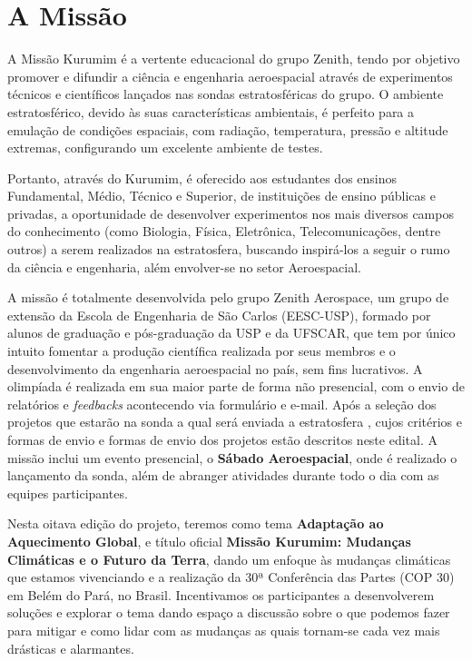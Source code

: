 \section{A Missão}\label{sec:missao}
    \par A Missão Kurumim é a vertente educacional do grupo Zenith, tendo por objetivo promover e difundir a ciência e engenharia aeroespacial através de experimentos técnicos e científicos lançados nas sondas estratosféricas do grupo. O ambiente estratosférico, devido às suas características ambientais, é perfeito para a emulação de condições espaciais, com radiação, temperatura, pressão e altitude extremas, configurando um excelente ambiente de testes.
    
    \par Portanto, através do Kurumim, é oferecido aos estudantes dos ensinos Fundamental, Médio, Técnico e Superior, de instituições de ensino públicas e privadas, a oportunidade de desenvolver experimentos nos mais diversos campos do conhecimento (como Biologia, Física, Eletrônica, Telecomunicações, dentre outros) a serem realizados na estratosfera, buscando inspirá-los a seguir o rumo da ciência e engenharia, além envolver-se no setor Aeroespacial.
    
    \par A missão é totalmente desenvolvida pelo grupo Zenith Aerospace, um grupo de extensão da 
    Escola de Engenharia de São Carlos (EESC-USP), formado por alunos de graduação e pós-graduação da USP
    e da UFSCAR, que tem por único intuito fomentar a produção científica realizada por seus membros e o 
    desenvolvimento da engenharia aeroespacial no país, sem fins lucrativos. 
    A olimpíada é realizada em sua maior parte de forma não presencial, com o envio de relatórios e \emph{feedbacks}
    acontecendo via formulário e e-mail. Após a seleção dos projetos que estarão na sonda a qual será enviada a estratosfera
    , cujos critérios e formas de envio e formas de envio dos projetos estão descritos neste edital. A missão
    inclui um evento presencial, o \textbf{Sábado Aeroespacial}, onde é realizado o lançamento da sonda, além
    de abranger atividades durante todo o dia com as equipes participantes.
    
    \par Nesta oitava edição do projeto, teremos como tema \textbf{Adaptação ao Aquecimento Global}, 
    e título oficial \textbf{Missão Kurumim: Mudanças Climáticas e o Futuro da Terra}, dando um enfoque
    às mudanças climáticas que estamos vivenciando e a realização da 30ª Conferência das Partes (COP 30) em Belém do Pará, no Brasil.
    Incentivamos os participantes a desenvolverem soluções e explorar o tema dando espaço a discussão sobre
    o que podemos fazer para mitigar e como lidar com as mudanças as quais tornam-se cada vez mais drásticas
    e alarmantes.
    
